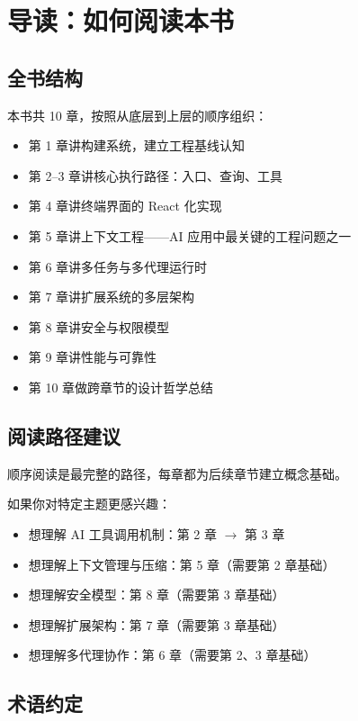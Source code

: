 \chapter*{导读：如何阅读本书}

\section*{全书结构}

本书共 10 章，按照从底层到上层的顺序组织：

\begin{itemize}
  \item 第 1 章讲构建系统，建立工程基线认知
  \item 第 2--3 章讲核心执行路径：入口、查询、工具
  \item 第 4 章讲终端界面的 React 化实现
  \item 第 5 章讲上下文工程——AI 应用中最关键的工程问题之一
  \item 第 6 章讲多任务与多代理运行时
  \item 第 7 章讲扩展系统的多层架构
  \item 第 8 章讲安全与权限模型
  \item 第 9 章讲性能与可靠性
  \item 第 10 章做跨章节的设计哲学总结
\end{itemize}

\section*{阅读路径建议}

顺序阅读是最完整的路径，每章都为后续章节建立概念基础。

如果你对特定主题更感兴趣：

\begin{itemize}
  \item 想理解 AI 工具调用机制：第 2 章 $\rightarrow$ 第 3 章
  \item 想理解上下文管理与压缩：第 5 章（需要第 2 章基础）
  \item 想理解安全模型：第 8 章（需要第 3 章基础）
  \item 想理解扩展架构：第 7 章（需要第 3 章基础）
  \item 想理解多代理协作：第 6 章（需要第 2、3 章基础）
\end{itemize}

\section*{术语约定}

